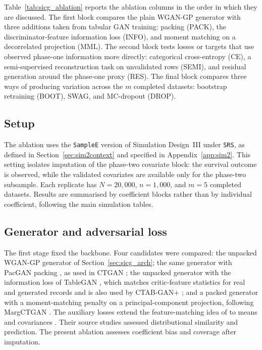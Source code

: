 Table~\ref{tab:sicg_ablation} reports the ablation columns in the order in which they are discussed. The first block compares the plain WGAN-GP generator with three additions taken from tabular GAN training: packing (PACK), the discriminator-feature information loss (INFO), and moment matching on a decorrelated projection (MML). The second block tests losses or targets that use observed phase-one information more directly: categorical cross-entropy (CE), a semi-supervised reconstruction task on unvalidated rows (SEMI), and residual generation around the phase-one proxy (RES). The final block compares three ways of producing variation across the \(m\) completed datasets: bootstrap retraining (BOOT), SWAG, and MC-dropout (DROP).

\subsection{Setup}
\label{sec:sicg_ablation_setup}

The ablation uses the \texttt{SampleE} version of Simulation Design~III under \texttt{SRS}, as defined in Section~\ref{sec:sim2context} and specified in Appendix~\ref{app:sim2}. This setting isolates imputation of the phase-two covariate block: the survival outcome is observed, while the validated covariates are available only for the phase-two subsample. Each replicate has \(N=20{,}000\), \(n=1{,}000\), and \(m=5\) completed datasets. Results are summarised by coefficient blocks rather than by individual coefficient, following the main simulation tables.

\subsection{Generator and adversarial loss}
\label{sec:sicg_ablation_generator}

The first stage fixed the backbone. Four candidates were compared: the unpacked WGAN-GP generator of Section~\ref{sec:sicg_arch}; the same generator with PacGAN packing \citep{lin2018pacgan}, as used in CTGAN \citep{xu2019modeling}; the unpacked generator with the information loss of TableGAN \citep{park2018data}, which matches critic-feature statistics for real and generated records and is also used by CTAB-GAN+ \citep{zhao2022ctabganplus}; and a packed generator with a moment-matching penalty on a principal-component projection, following MargCTGAN \citep{afonja2023margctgan}. The auxiliary losses extend the feature-matching idea of \citet{salimans2016improved} to means and covariances \citep{mroueh2017mcgan}. Their source studies assessed distributional similarity and prediction. The present ablation assesses coefficient bias and coverage after imputation.

